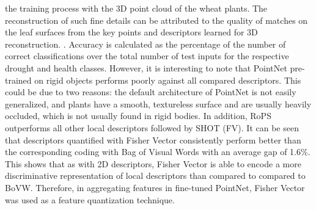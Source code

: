 the training process with the 3D point cloud of the wheat plants. The reconstruction of such fine details can be attributed to the quality of matches on the leaf surfaces
from the key points and descriptors learned for 3D reconstruction. . Accuracy is calculated as the percentage of the number of correct classifications over the total
number of test inputs for the respective drought and health classes. However, it is interesting to note that PointNet pre-trained on rigid objects performs poorly against
all compared descriptors. This could be due to two reasons: the default architecture of PointNet is not easily generalized, and plants have a smooth, textureless surface
and are usually heavily occluded, which is not usually found in rigid bodies. In addition, RoPS outperforms all other local descriptors followed by SHOT (FV). It can
be seen that descriptors quantified with Fisher Vector consistently perform better than the corresponding coding with Bag of Visual Words with an average gap of 1.6\%.
This shows that as with 2D descriptors, Fisher Vector is able to encode a more discriminative representation of local descriptors than compared to compared to BoVW.
Therefore, in aggregating features in fine-tuned PointNet, Fisher Vector was used as a feature quantization technique.


